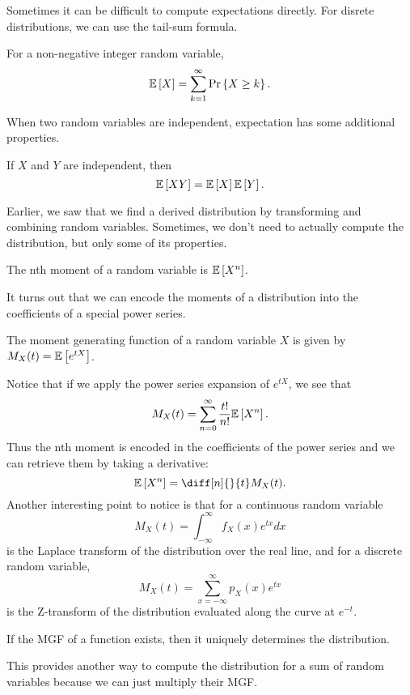Sometimes it can be difficult to compute expectations directly. For disrete distributions, we can use the tail-sum formula.
\begin{theorem}
  For a non-negative integer random variable,
  \[
	\mathbb{E}\left[X\right] = \sum_{k=1}^{\infty}\text{Pr}\left\{X\geq k\right\}.
  \]
  \label{thm:tail-sum}
\end{theorem}
When two random variables are independent, expectation has some additional properties.
\begin{theorem}
  If $X$ and $Y$ are independent, then
  \[
	\mathbb{E}\left[XY\right] = \mathbb{E}\left[X\right]\mathbb{E}\left[Y\right].
  \]
  \label{thm:indep-expect}
\end{theorem}
Earlier, we saw that we find a derived distribution by transforming and combining random variables.
Sometimes, we don't need to actually compute the distribution, but only some of its properties.
\begin{definition}
  The nth moment of a random variable is $\mathbb{E}\left[X^n\right]$.
  \label{defn:moment}
\end{definition}
It turns out that we can encode the moments of a distribution into the coefficients of a special power series.
\begin{definition}
  The moment generating function of a random variable $X$ is given by $M_X(t) = \mathbb{E}\left[e^{tX}\right]$.
  \label{defn:mgf}
\end{definition}
Notice that if we apply the power series expansion of $e^{tX}$, we see that \[
  M_X(t) = \sum_{n=0}^{\infty}\frac{t!}{n!}\mathbb{E}\left[X^n\right].
\]
Thus the nth moment is encoded in the coefficients of the power series and we can retrieve them by taking a derivative:
\[
  \expect{X^n} = \diff[n]{}{t}M_X(t).
\]
Another interesting point to notice is that for a continuous random variable
\[
  M_X(t) = \int_{-\infty}^{\infty}f_X(x)e^{tx}dx
\]
is the Laplace transform of the distribution over the real line,
and for a discrete random variable,
\[
  M_X(t) = \sum_{x=-\infty}^{\infty}p_X(x)e^{tx}
\]
is the Z-transform of the distribution evaluated along the curve at $e^{-t}$.
\begin{theorem}
  If the MGF of a function exists, then it uniquely determines the distribution.
  \label{thm:mgf}
\end{theorem}
This provides another way to compute the distribution for a sum of random variables because we can just multiply their MGF.
